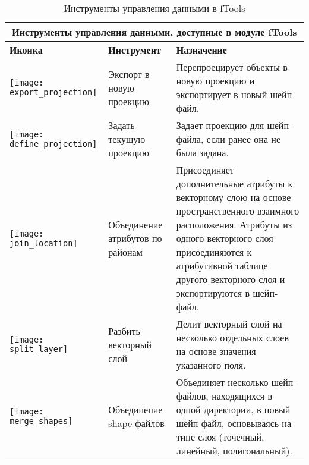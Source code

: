 \begin{table}[ht]
\centering
\begin{tabular}{|m{1cm}|m{4cm}|m{9cm}|}
 \hline \multicolumn{3}{|c|}{\textbf{Инструменты управления данными, доступные в модуле fTools}} \\
 \hline \textbf{Иконка} & \textbf{Инструмент} & \textbf{Назначение} \\
 \hline \texttt{[image: export\_projection]} & Экспорт в новую проекцию &
 Перепроецирует объекты в новую проекцию и экспортирует в новый шейп-файл. \\
 \hline \texttt{[image: define\_projection]} & Задать текущую проекцию &
 Задает проекцию для шейп-файла, если ранее она не была задана. \\
 \hline \texttt{[image: join\_location]} & Объединение атрибутов по районам & Присоединяет
 дополнительные атрибуты к векторному слою на основе пространственного взаимного расположения.
 Атрибуты из одного векторного слоя присоединяются к атрибутивной таблице другого векторного слоя и
 экспортируются в шейп-файл. \\
 \hline \texttt{[image: split\_layer]} & Разбить векторный слой &
 Делит векторный слой на несколько отдельных слоев на основе значения указанного поля. \\
 \hline \texttt{[image: merge\_shapes]} & Объединение shape-файлов &
 Объединяет несколько шейп-файлов, находящихся в одной директории, в новый шейп-файл,
 основываясь на типе слоя (точечный, линейный, полигональный). \\
 \hline
\end{tabular}
\caption{Инструменты управления данными в fTools}\label{tab:fTool_data_management}
\end{table}

\FloatBarrier
